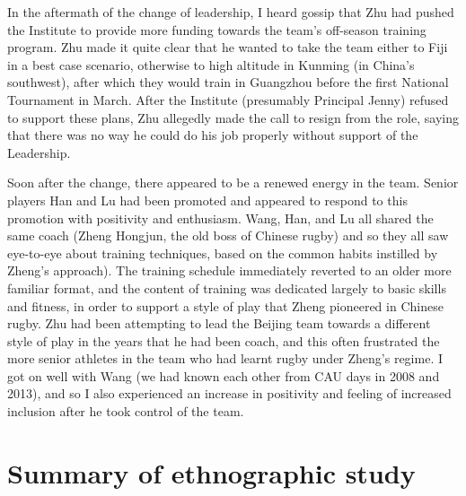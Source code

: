 \begin{CJK}{UTF8}{gbsn}
In the aftermath of the change of leadership, I heard gossip that Zhu had pushed the Institute to provide more funding towards the team's off-season training program.  Zhu  made it quite clear that he wanted to take the team either to Fiji in a best case scenario, otherwise to high altitude in Kunming (in China's southwest), after which they would train in Guangzhou before the first National Tournament in March.  After the Institute (presumably Principal Jenny) refused to support these plans, Zhu allegedly made the call to resign from the role, saying that there was no way he could do his job properly without support of the Leadership.

Soon after the change, there appeared to be a renewed energy in the team.  Senior players Han and Lu had been promoted and appeared to respond to this promotion with positivity and enthusiasm.  Wang, Han, and Lu all shared the same coach (Zheng Hongjun, the old boss of Chinese rugby) and so they all saw eye-to-eye about training techniques, based on the common habits instilled by Zheng's approach).  The training schedule immediately reverted to an older more familiar format, and the content of training was dedicated largely to basic skills and fitness, in order to support a style of play that Zheng pioneered in Chinese rugby.  Zhu had been attempting to lead the Beijing team towards a different style of play in the years that he had been coach, and this often frustrated the more senior athletes in the team who had learnt rugby under Zheng's regime.  I got on well with Wang (we had known each other from CAU days in 2008 and 2013), and so I also experienced an increase in positivity and feeling of increased inclusion after he took control of the team.


\section{Summary of ethnographic study}




                                                          \end{CJK}
